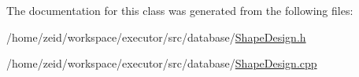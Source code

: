 The documentation for this class was generated from the following files:\begin{DoxyCompactItemize}
\item 
/home/zeid/workspace/executor/src/database/\hyperlink{_shape_design_8h}{ShapeDesign.h}\item 
/home/zeid/workspace/executor/src/database/\hyperlink{_shape_design_8cpp}{ShapeDesign.cpp}\end{DoxyCompactItemize}
